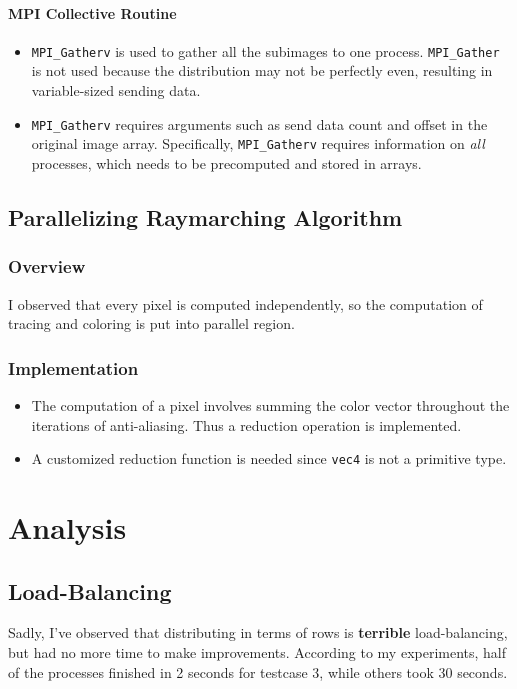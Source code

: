 \documentclass[a4paper, 10pt]{article}
\begin{document}
        \paragraph{MPI Collective Routine}
          \begin{itemize}
            \item \texttt{MPI\_Gatherv} is used to gather all the subimages to one process. 
              \texttt{MPI\_Gather} is not used because the distribution may not be perfectly even, 
              resulting in variable-sized sending data.
            \item \texttt{MPI\_Gatherv} requires arguments such as send data count and offset 
              in the original image array. Specifically, \texttt{MPI\_Gatherv} requires information on 
              \textit{all} processes, which needs to be precomputed and stored in arrays.
          \end{itemize}

    \subsection{Parallelizing Raymarching Algorithm}
      \subsubsection{Overview}
        I observed that every pixel is computed independently, 
        so the computation of tracing and coloring is put into parallel region.

      \subsubsection{Implementation}
        \begin{itemize}
          \item The computation of a pixel involves summing the color vector 
            throughout the iterations of anti-aliasing. Thus a reduction operation is implemented.
          \item A customized reduction function is needed since \texttt{vec4} is not a primitive type.
        \end{itemize}

  \section{Analysis}
    \subsection{Load-Balancing}
      Sadly, I've observed that distributing in terms of rows is \textbf{terrible} load-balancing, 
      but had no more time to make improvements.
      According to my experiments, half of the processes finished in 2 seconds for testcase 3, 
      while others took 30 seconds.
\end{document}
